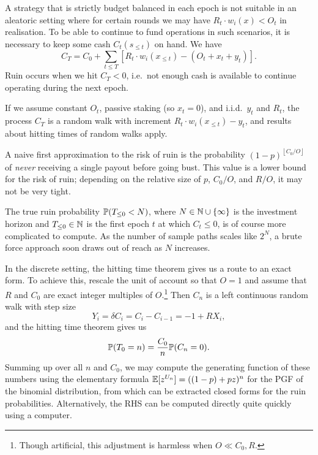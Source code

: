 A strategy that is strictly budget balanced in each epoch is not suitable in an aleatoric setting where for certain rounds we may have $R_t\cdot w_i(x) < O_t$ in realisation.
%
To be able to continue to fund operations in such scenarios, it is necessary to keep some cash $C_t(s_{\leq t})$ on hand.
%
We have
\[
  C_T = C_0 + \sum_{t\leq T} \left[ R_t\cdot w_i(x_{\leq t}) - (O_t + x_t + y_t) \right].
\]
Ruin occurs when we hit $C_T < 0$, i.e.~not enough cash is available to continue operating during the next epoch.

If we assume constant $O_t$, passive staking (so $x_t = 0$), and i.i.d.~$y_t$ and $R_t$, the process $C_T$ is a random walk with increment $R_t\cdot w_i(x_{\leq t}) - y_t$, and results about hitting times of random walks apply.

\begin{example}
  
  A naive first approximation to the risk of ruin is the probability $(1-p)^{\left\lfloor C_0/O \right\rfloor}$ of \emph{never} receiving a single payout before going bust.
  This value is a lower bound for the risk of ruin; depending on the relative size of $p$, $C_0/O$, and $R/O$, it may not be very tight.
  
\end{example}

    The true ruin probability $\mathbb{P}(T_{\leq 0}<N)$, where $N\in\mathbb{N}\cup\{\infty\}$ is the investment horizon and $T_{\leq 0}\in\mathbb{N}$ is the first epoch $t$ at which $C_t\leq 0$, is of course more complicated to compute.
    As the number of sample paths scales like $2^N$, a brute force approach soon draws out of reach as $N$ increases.

    In the discrete setting, the hitting time theorem gives us a route to an exact form.
    To achieve this, rescale the unit of account so that $O=1$ and assume that $R$ and $C_0$ are exact integer multiples of $O$.\footnote{Though artificial, this adjustment is harmless when $O\ll C_0,R$.}
    Then $C_n$ is a left continuous random walk with step size
    \[
      Y_i = \delta C_i = C_i - C_{i-1} = - 1 + RX_i,
    \] 
    and the hitting time theorem gives us
    \[
      \mathbb{P}(T_0 = n) = \frac{C_0}{n}\mathbb{P}(C_n = 0).
    \]
Summing up over all $n$ and $C_0$, we may compute the generating function of these numbers using the elementary formula $\mathbb{E}[z^{U_n}] = ((1-p) + pz)^n$ for the PGF of the binomial distribution, from which can be extracted closed forms for the ruin probabilities.
%
Alternatively, the RHS can be computed directly quite quickly using a computer.    

